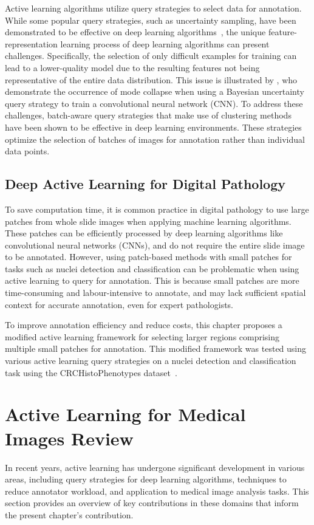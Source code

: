 Active learning algorithms utilize query strategies to select data for annotation. While some popular query strategies, such as uncertainty sampling, have been demonstrated to be effective on deep learning algorithms~\citep{gal2017deep}, the unique feature-representation learning process of deep learning algorithms can present challenges. Specifically, the selection of only difficult examples for training can lead to a lower-quality model due to the resulting features not being representative of the entire data distribution. This issue is illustrated by \cite{pop2018deep}, who demonstrate the occurrence of mode collapse when using a Bayesian uncertainty query strategy to train a convolutional neural network (CNN). To address these challenges, batch-aware query strategies that make use of clustering methods have been shown to be effective in deep learning environments\citep{sener2017active, zhdanov2019diverse, kirsch2019batchbald}. These strategies optimize the selection of batches of images for annotation rather than individual data points.

\subsection{Deep Active Learning for Digital Pathology}
\label{subsec:active_deep_learning}
To save computation time, it is common practice in digital pathology to use large patches from whole slide images when applying machine learning algorithms. These patches can be efficiently processed by deep learning algorithms like convolutional neural networks (CNNs), and do not require the entire slide image to be annotated. However, using patch-based methods with small patches for tasks such as nuclei detection and classification can be problematic when using active learning to query for annotation. This is because small patches are more time-consuming and labour-intensive to annotate, and may lack sufficient spatial context for accurate annotation, even for expert pathologists.

To improve annotation efficiency and reduce costs, this chapter proposes a modified active learning framework for selecting larger regions comprising multiple small patches for annotation. This modified framework was tested using various active learning query strategies on a nuclei detection and classification task using the CRCHistoPhenotypes dataset~\citep{sirinukunwattana2016locality}.



\section{Active Learning for Medical Images Review}
\label{sec:active_review}
In recent years, active learning has undergone significant development in various areas, including query strategies for deep learning algorithms, techniques to reduce annotator workload, and application to medical image analysis tasks. This section provides an overview of key contributions in these domains that inform the present chapter's contribution.

